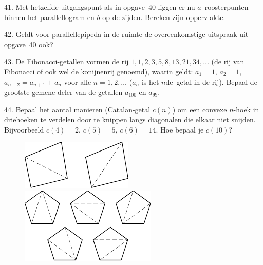 \begin{problem}{41.}
	Met hetzelfde uitgangspunt als in opgave~40 liggen er nu $a$~roos\-terpunten binnen het parallellogram en $b$ op de zijden. Bereken zijn oppervlakte.
\end{problem}

\begin{problem}{42.}
	Geldt voor parallellepipeda in de ruimte de overeenkomstige uitspraak uit opgave~40 ook?
\end{problem}

\begin{problem}{43.}
	De Fibonacci-getallen vormen de rij $1,1,2,3,5,8,13,21,34,\dotsc$ (de rij van Fibonacci of ook wel de konijnenrij genoemd), waarin geldt: $a_1 = 1$, $a_2 = 1$, $a_{n+2} = a_{n+1} + a_n$ voor alle $n = 1,2,\dotsc$ ($a_n$ is het $n$de~getal in de rij). Bepaal de grootste gemene deler van de getallen $a_{100}$ en $a_{99}$.
\end{problem}

\clearpage

\begin{problem}{44.}
	Bepaal het aantal manieren (Catalan-getal $c(n)$) om een convexe $n$-hoek in driehoeken te verdelen door te knippen langs diagonalen die elkaar niet snijden. Bijvoorbeeld $c(4) = 2$, $c(5) = 5$, $c(6) = 14$. Hoe bepaal je $c(10)$?
	\begin{figure}
		\includegraphics{resources/taskbook-281}
		\qquad
		\includegraphics{resources/taskbook-282}
	\end{figure}
\end{problem}

